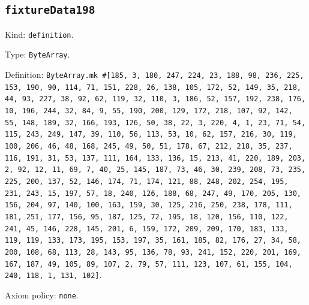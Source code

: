 \documentclass[11pt]{article}
\begin{document}
\subsection*{\texttt{fixtureData198}}
\noindent Kind: \texttt{definition}.\par
\noindent Type: \texttt{ByteArray}.\par
\noindent Definition: \texttt{ByteArray.mk \#[185, 3, 180, 247, 224, 23, 188, 98, 236, 225, 153, 190, 90, 114, 71, 151, 228, 26, 138, 105, 172, 52, 149, 35, 218, 44, 93, 227, 38, 92, 62, 119, 32, 110, 3, 186, 52, 157, 192, 238, 176, 10, 196, 244, 32, 84, 9, 55, 190, 200, 129, 172, 218, 107, 92, 142, 55, 148, 189, 32, 166, 193, 126, 50, 38, 22, 3, 220, 4, 1, 23, 71, 54, 115, 243, 249, 147, 39, 110, 56, 113, 53, 10, 62, 157, 216, 30, 119, 100, 206, 46, 48, 168, 245, 49, 50, 51, 178, 67, 212, 218, 35, 237, 116, 191, 31, 53, 137, 111, 164, 133, 136, 15, 213, 41, 220, 189, 203, 2, 92, 12, 11, 69, 7, 40, 25, 145, 187, 73, 46, 30, 239, 208, 73, 235, 225, 200, 137, 52, 146, 174, 71, 174, 121, 88, 248, 202, 254, 195, 231, 243, 15, 197, 57, 18, 240, 126, 188, 68, 247, 49, 170, 205, 130, 156, 204, 97, 140, 100, 163, 159, 30, 125, 216, 250, 238, 178, 111, 181, 251, 177, 156, 95, 187, 125, 72, 195, 18, 120, 156, 110, 122, 241, 45, 146, 228, 145, 201, 6, 159, 172, 209, 209, 170, 183, 133, 119, 119, 133, 173, 195, 153, 197, 35, 161, 185, 82, 176, 27, 34, 58, 200, 108, 68, 113, 28, 143, 95, 136, 78, 93, 241, 152, 220, 201, 169, 167, 187, 49, 105, 89, 107, 2, 79, 57, 111, 123, 107, 61, 155, 104, 240, 118, 1, 131, 102]}.\par
\noindent Axiom policy: \texttt{none}.\par
\end{document}
